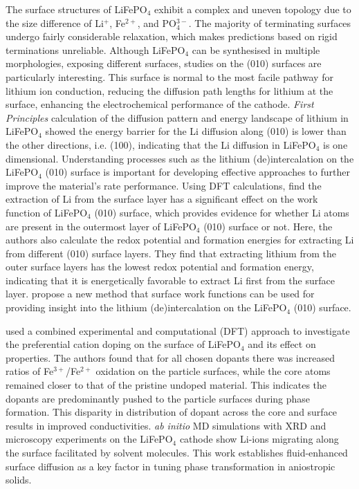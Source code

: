 \documentclass[../main.tex]{subfiles}
\begin{document}
The surface structures of LiFePO$_4$ exhibit a complex and uneven topology due to the size difference of Li$^+$, Fe$^{2+}$, and PO$_{4}^{3-}$. The majority of terminating surfaces undergo fairly considerable relaxation, which makes predictions based on rigid terminations unreliable. Although LiFePO$_4$ can be synthesised in multiple morphologies, \cite{chen2006electron,ellis2007synthesis} exposing different surfaces, studies on the (010) surfaces are particularly interesting. This surface is normal to the most facile pathway for lithium ion conduction, \cite{islam2010recent} reducing the diffusion path lengths for lithium at the surface, enhancing the electrochemical performance of the cathode. \textit{First Principles} calculation of the diffusion pattern and energy landscape of lithium in LiFePO$_4$ showed the energy barrier for the Li diffusion along (010) is lower than the other directions, i.e. (100), indicating that the Li diffusion in LiFePO$_4$ is one dimensional. \cite{tankhilsaikhan2019density} Understanding processes such as the lithium (de)intercalation on the LiFePO$_4$ (010) surface is important for developing effective approaches to further improve the material's rate performance. Using DFT calculations, \citeauthor{xu2019insight} find the extraction of Li from the surface layer has a significant effect on the work function of LiFePO$_4$ (010) surface, which provides evidence for whether Li atoms are present in the outermost layer of LiFePO$_4$ (010) surface or not. \cite{xu2019insight} Here, the authors also calculate the redox potential and formation energies for extracting Li from different (010) surface layers. They find that extracting lithium from the outer surface layers has the lowest redox potential and formation energy, indicating that it is energetically favorable to extract Li first from the surface layer. \citeauthor{xu2019insight} propose a new method that surface work functions can be used for providing insight into the lithium (de)intercalation on the LiFePO$_4$ (010) surface. \cite{xu2019insight}

\citeauthor{zhang2020observation} used a combined experimental and computational (DFT) approach to investigate the preferential cation doping on the surface of LiFePO$_4$ and its effect on properties. \cite{zhang2020observation} The authors found that for all chosen dopants there was increased ratios of Fe$^{3+}$/Fe$^{2+}$ oxidation on the particle surfaces, while the core atoms remained closer to that of the pristine undoped material. This indicates the dopants are predominantly pushed to the particle surfaces during phase formation. This disparity in distribution of dopant across the core and surface results in improved conductivities. \cite{zhang2020observation} \textit{ab initio} MD simulations with XRD and microscopy experiments on the LiFePO$_4$ cathode show Li-ions migrating along the surface facilitated by solvent molecules. \cite{li2018fluid} This work establishes fluid-enhanced surface diffusion as a key factor in tuning phase transformation in aniostropic solids.
\end{document}
